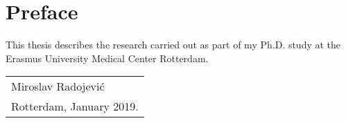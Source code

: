 %
% 

\chpos{14mm}{10mm}
\chapter*{Preface}




This thesis describes the research carried out as part of my Ph.D. study at the Erasmus University Medical Center Rotterdam.
\bigskip
\begin{flushright}
  \begin{tabular}{@{}l@{}}
    Miroslav Radojevi\'{c}\\
    Rotterdam, January 2019.
  \end{tabular}
\end{flushright}
